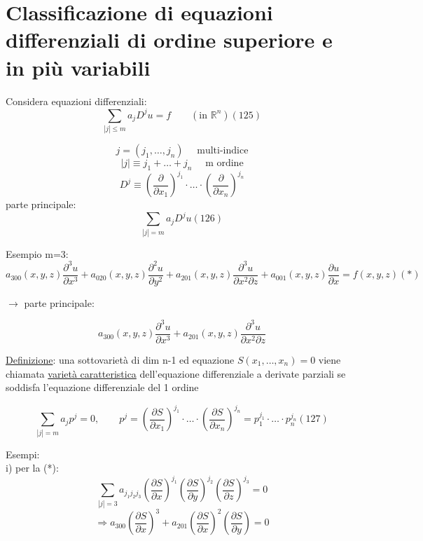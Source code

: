 \documentclass[a4paper,11pt]{report}
\newcommand{\Rn}{\mathbb{R}^n}
\begin{document}
\section{Classificazione di equazioni differenziali di ordine superiore e in più variabili}

Considera equazioni differenziali:
\begin{equation}
\sum_{|j|\leq m}a_j D^j u = f \qquad (\text{in } \Rn) (125)
\end{equation}

$$ j=(j_1,\dots,j_n) \quad \text{ multi-indice}$$
$$|j| \equiv j_1 + \dots + j_n \quad \text{ m ordine}$$
$$D^j \equiv \left(\dfrac{\partial}{\partial x_1}\right)^{j_1} \cdot \dots \cdot \left(\dfrac{\partial}{\partial x_n}\right)^{j_n}$$
parte principale: 
\begin{equation}
\sum_{|j| = m} a_j D^j u (126)
\end{equation}

Esempio m=3: 
$$
a_{300}(x,y,z)\dfrac{\partial ^3 u}{\partial x^3} + a_{020}(x,y,z)\dfrac{\partial ^2 u}{\partial y^2} + a_{201}(x,y,z)\dfrac{\partial ^3 u}{\partial x^2\partial z} + a_{001}(x,y,z)\dfrac{\partial u}{\partial x} = f(x,y,z) (*)
$$

$\rightarrow$ parte principale:

$$
a_{300}(x,y,z)\dfrac{\partial ^3 u}{\partial x^3} + a_{201}(x,y,z)\dfrac{\partial ^3 u}{\partial x^2\partial z}
$$

\underline{Definizione}: una sottovarietà di dim n-1 ed equazione $S(x_1,\dots,x_n)=0$ viene chiamata \underline{varietà caratteristica} dell'equazione differenziale a derivate parziali se soddisfa l'equazione differenziale del 1 ordine

\begin{equation}
\sum_{|j| =m} a_j p^j=0 , \qquad p^j=\left(\dfrac{\partial S}{\partial x_1}\right)^{j_1} \cdot \dots \cdot \left(\dfrac{\partial S}{\partial x_n}\right)^{j_n} = p_1^{j_1}\cdot \dots \cdot p_n^{j_n} (127)
\end{equation}

Esempi:\\
i) per la (*): 
$$
\sum_{|j| = 3}a_{j_1 j_2 j_3}\left(\dfrac{\partial S}{\partial x}\right)^{j_1}\left(\dfrac{\partial S}{\partial y}\right)^{j_2}\left(\dfrac{\partial S}{\partial z}\right)^{j_3}=0
$$
$$
\Rightarrow a_{300}\left(\dfrac{\partial S}{\partial x}\right)^3 + a_{201}\left(\dfrac{\partial S}{\partial x}\right)^2\left(\dfrac{\partial S}{\partial y}\right)=0
$$
\end{document}
